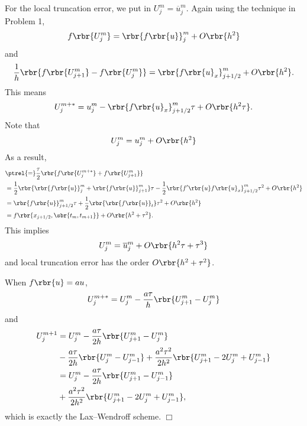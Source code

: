 \documentclass[english, nochinese]{pnote}
\begin{document}
For the local truncation error, we put in $ U_j^m = \overline{u}_j^m $. Again using the technique in Problem 1,
\begin{equation}
f \rbr{U_j^m} = \rbr{ f \rbr{u} }_j^m + O \rbr{h^2}
\end{equation}
and
\begin{equation}
\frac{1}{h} \rbr{ f \rbr{U_{ j + 1 }^m} - f \rbr{U_j^m} } = \rbr{ f \rbr{u}_x }_{ j + 1 / 2 }^m + O \rbr{h^2}.
\end{equation}
This means
\begin{equation}
U_j^{ m + \ast } = u_j^m - \rbr{ f \rbr{u}_x }_{ j + 1 / 2 }^m \tau + O \rbr{ h^2 \tau }.
\end{equation}
Note that
\begin{equation}
U_j^m = u_j^m + O \rbr{h^2}
\end{equation}
As a result,
\begin{equation}
\begin{split}
&\ptrel{=} \frac{\tau}{2} \rbr{ f \rbr{U_j^{ m + \ast }} + f \rbr{U_{ j + 1 }^m} } \\
&= \frac{1}{2} \rbr{ \rbr{ f \rbr{u} }_j^m + \rbr{ f \rbr{u} }_{ j + 1 }^m } \tau - \frac{1}{2} \rbr{ f' \rbr{u} f \rbr{u}_x }_{ j + 1 / 2 }^m \tau^2 + O \rbr{h^2} \\
&= \rbr{ f \rbr{u} }_{ j + 1 / 2 }^m \tau + \frac{1}{2} \rbr{\rbr{ f \rbr{u} }_t} \tau^2 + O \rbr{h^2} \\
&= f \rbr{ x_{ j + 1 / 2 }, \sbr{ t_m, t_{ m + 1 } } } + O \rbr{ h^2 + \tau^2 }.
\end{split}
\end{equation}
This implies
\begin{equation}
U_j^m = \overline{u}_j^m + O \rbr{ h^2 \tau + \tau^3 }
\end{equation}
and local truncation error has the order $ O \rbr{ h^2 + \tau^2 } $.

When $ f \rbr{u} = a u $,
\begin{equation}
U_j^{ m + \ast } = U_j^m - \frac{ a \tau }{h} \rbr{ U_{ j + 1 }^m - U_j^m }
\end{equation}
and
\begin{equation}
\begin{split}
U_j^{ m + 1 } &= U_j^m - \frac{ a \tau }{ 2 h } \rbr{ U_{ j + 1 }^m - U_j^m } \\
&- \frac{ a \tau }{ 2 h } \rbr{ U_j^m - U_{ j - 1 }^m } + \frac{ a^2 \tau^2 }{ 2 h^2 } \rbr{ U_{ j + 1 }^m - 2 U_j^m + U_{ j - 1 }^m } \\
&= U_j^m - \frac{ a \tau }{ 2 h } \rbr{ U_{ j + 1 }^m - U_{ j - 1 }^m } \\
&+ \frac{ a^2 \tau^2 }{ 2 h^2 } \rbr{ U_{ j + 1 }^m - 2 U_j^m + U_{ j - 1 }^m },
\end{split}
\end{equation}
which is exactly the Lax--Wendroff scheme.
\hfill$\Box$
\end{document}
